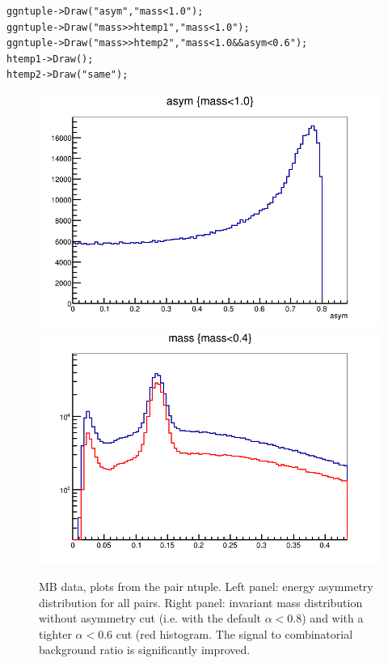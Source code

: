 \documentclass[pdftex,12pt,letter]{article}
\begin{document}
\begin{lstlisting}
ggntuple->Draw("asym","mass<1.0");
ggntuple->Draw("mass>>htemp1","mass<1.0");
ggntuple->Draw("mass>>htemp2","mass<1.0&&asym<0.6");
htemp1->Draw();
htemp2->Draw("same");
\end{lstlisting}


\begin{center}
\begin{figure}[htbp]
  \includegraphics[width=0.4\linewidth]{figs/mbasym.png}
  \includegraphics[width=0.4\linewidth]{figs/mbinvmassasym.png}
  \caption{MB data, plots from the pair ntuple.  Left panel: energy
    asymmetry distribution for all pairs.  
    Right panel: invariant mass distribution without asymmetry cut
    (i.e. with the default $\alpha<0.8$) and with a tighter
    $\alpha<0.6$ cut (red histogram.  The signal to combinatorial
    background ratio is significantly improved.
  }
    \label{fig:asym_pt}
\end{figure}
\end{center}
\end{document}
